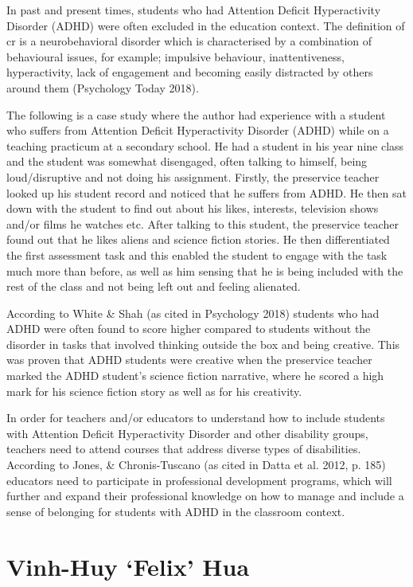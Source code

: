 \documentclass[twoside,12pt,a4paper,notitlepage]{memoir}
\begin{document}
In past and present times, students who had Attention Deficit Hyperactivity Disorder (ADHD) were often excluded in the education context. The definition of cr is a neurobehavioral disorder which is characterised by a combination of behavioural issues, for example; impulsive behaviour, inattentiveness, hyperactivity, lack of engagement and becoming easily distracted by others around them (Psychology Today 2018). 

The following is a case study where the author had experience with a student who suffers from Attention Deficit Hyperactivity Disorder (ADHD) while on a teaching practicum at a secondary school. He had a student in his year nine class and the student was somewhat disengaged, often talking to himself, being loud/disruptive and not doing his assignment. Firstly, the preservice teacher looked up his student record and noticed that he suffers from ADHD. He then sat down with the student to find out about his likes, interests, television shows and/or films he watches etc. After talking to this student, the preservice teacher found out that he likes aliens and science fiction stories. He then differentiated the first assessment task and this enabled the student to engage with the task much more than before, as well as him sensing that he is being included with the rest of the class and not being left out and feeling alienated. 

According to White \& Shah (as cited in Psychology 2018) students who had ADHD were often found to score higher compared to students without the disorder in tasks that involved thinking outside the box and being creative. This was proven that ADHD students were creative when the preservice teacher marked the ADHD student’s science fiction narrative, where he scored a high mark for his science fiction story as well as for his creativity.


In order for teachers and/or educators to understand how to include students with Attention Deficit Hyperactivity Disorder and other disability groups, teachers need to attend courses that address diverse types of disabilities. According to Jones, \& Chronis-Tuscano (as cited in Datta et al. 2012, p. 185) educators need to participate in professional development programs, which will further and expand their professional knowledge on how to manage and include a sense of belonging for students with ADHD in the classroom context.

\section*{Vinh-Huy `Felix’ Hua}
\end{document}
